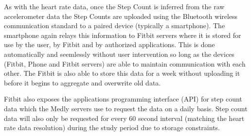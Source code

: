 \documentclass[]{article}
\begin{document}
\begin{enumerate}
	As with the heart rate data, once the Step Count is inferred from the raw accelerometer data the Step Counts are uploaded using the Bluetooth wireless communication standard to a paired device (typically a smartphone). The smartphone again relays this information to Fitbit servers where it is stored for use by the user, by Fitbit and by authorized applications. This is done automatically and seemlessly without user intervention so long as the devices (Fitbit, Phone and Fitbit servers) are able to maintain communication with each other. The Fitbit is also able to store this data for a week without uploading it before it begins to aggregate and overwrite old data.
	
	Fitbit also exposes the applications programming interface (API) for step count data which the Medly servers use to request the data on a daily basis. Step count data will also only be requested for every 60 second interval (matching the heart rate data resolution) during the study period due to storage constraints. 

\end{enumerate}
\end{document}
